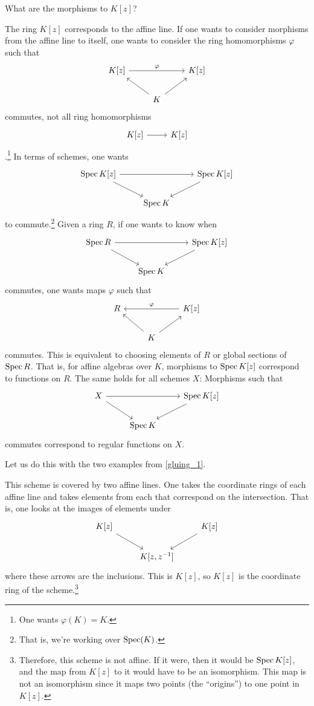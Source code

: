 \documentclass [11 pt, oneside] {article}
\begin{document}
\begin{problem}
	What are the morphisms to $K[z]$?
\end{problem}

The ring $K[z]$ corresponds to the affine line. If one wants to consider morphisms from the affine line to itself, one wants to consider the ring homomorphisms $\varphi$ such that
\[
\begin{tikzcd}
	K[z] \ar[rr, "\varphi"] &&K[z] \\
			       &K\ar[lu] \ar[ru]
\end{tikzcd}
\]
commutes, not all ring homomorphisms 
\[
\begin{tikzcd}
K[z] \ar[r]& K[z]
\end{tikzcd}
\] 
.\footnote{One wants $\varphi(K)=K$.} In terms of schemes, one wants
\[
\begin{tikzcd}
	\Spec K[z] \ar[dr] \ar[rr] &&\Spec K[z] \ar[dl]\\
				   &\Spec K
\end{tikzcd}
\]
to commute.\footnote{That is, we're working over $\operatorname{Spec}(K)$.} Given a ring $R$, if one wants to know when
\[
\begin{tikzcd}
\Spec R \ar[dr] \ar[rr] &&\Spec K[z] \ar[dl]\\
                                   &\Spec K	
\end{tikzcd}
\]
commutes, one wants maps $\varphi$ such that
\[
\begin{tikzcd}
	R && K[z] \ar[ll,  "\varphi",  swap] \\
	  &K \ar[ul]\ar[ur]
\end{tikzcd}
\]
commutes. This is equivalent to choosing elements of $R$ or global sections of $\operatorname{Spec} R$. That is, for affine algebras over $K$, morphisms to $\operatorname{Spec} K[z]$ correspond to functions on $R$. The same holds for all schemes $X$: Morphisms such that
\[
\begin{tikzcd}
	X \ar[dr] \ar[rr] &&\Spec K[z] \ar[dl]\\
                                   &\Spec K    
\end{tikzcd}
\]
commutes correspond to regular functions on $X$.

Let us do this with the two examples from \cref{gluing_1}.

\begin{example}\label{}\text{}
This scheme is covered by two affine lines. One takes the coordinate rings of each affine line and takes elements from each that correspond on the intersection. That is, one looks at the images of elements under
\[
\begin{tikzcd}
	K[z]\ar[dr] && K[z] \ar[dl]\\
	&K[z,z^{-1}]
\end{tikzcd}
\]
where these arrows are the inclusions. This is $K[z]$, so $K[z]$ is the coordinate ring of the scheme.\footnote{Therefore, this scheme is not affine. If it were, then it would be $\operatorname{Spec} K[z]$, and the map from $K[z]$ to it would have to be an isomorphism. This map is not an isomorphism since it maps two points (the ``origins'') to one point in $K[z]$.}
\end{example}
\end{document}
